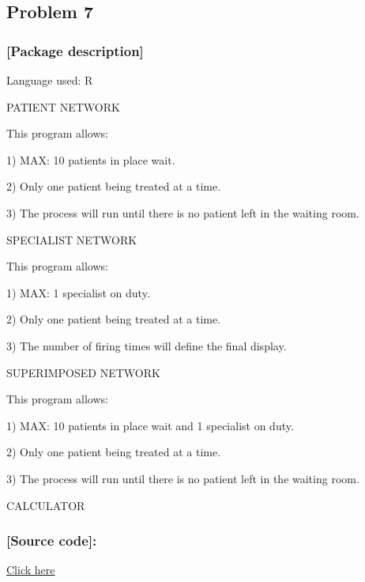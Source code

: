\documentclass[a4paper]{article}
\begin{document}
\subsection {Problem 7}
\subsubsection{[Package description]}
Language used: R
\par\null\par
[ITEM 1] PATIENT NETWORK\par
This program allows:\par
1) MAX: 10 patients in place wait.\par
2) Only one patient being treated at a time.\par
3) The process will run until there is no patient left in the waiting room.
\par\null\par
[ITEM 2] SPECIALIST NETWORK\par
This program allows: \par
1) MAX: 1 specialist on duty.\par
2) Only one patient being treated at a time.\par
3) The number of firing times will define the final display.
\par\null\par
[ITEM 3] SUPERIMPOSED NETWORK\par
This program allows: \par
1) MAX: 10 patients in place wait and 1 specialist on duty.\par
2) Only one patient being treated at a time.\par
3) The process will run until there is no patient left in the waiting room.
\par\null\par
[ITEM 4] CALCULATOR
\subsubsection{[Source code]:}
\href{https://drive.google.com/drive/folders/1G4_9ujAwx-T7atTZgRQO23wBjPQ4VADA?usp=sharing}{Click here}


\vspace{2 cm}
\end{document}
